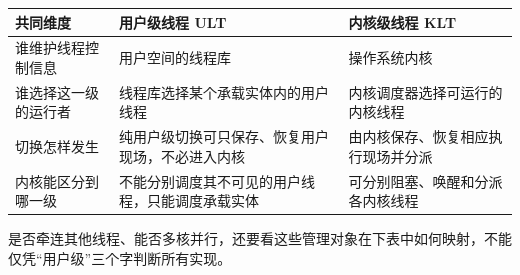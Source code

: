 \begin{wideblock}

\par\medskip\noindent\begin{minipage}{\linewidth}\fontsize{9.3}{12}\selectfont\begin{tabularx}{\linewidth}{@{}YYY@{}}
\toprule\noalign{}
\begin{minipage}[b]{\linewidth}\raggedright
共同维度
\end{minipage} & \begin{minipage}[b]{\linewidth}\raggedright
用户级线程 ULT
\end{minipage} & \begin{minipage}[b]{\linewidth}\raggedright
内核级线程 KLT
\end{minipage} \\
\midrule\noalign{}


谁维护线程控制信息 & 用户空间的线程库 & 操作系统内核 \\
谁选择这一级的运行者 & 线程库选择某个承载实体内的用户线程 & 内核调度器选择可运行的内核线程 \\
切换怎样发生 & 纯用户级切换可只保存、恢复用户现场，不必进入内核 & 由内核保存、恢复相应执行现场并分派 \\
内核能区分到哪一级 & 不能分别调度其不可见的用户线程，只能调度承载实体 & 可分别阻塞、唤醒和分派各内核线程 \\
\bottomrule\end{tabularx}
\end{minipage}\par\medskip

\end{wideblock}

是否牵连其他线程、能否多核并行，还要看这些管理对象在下表中如何映射，不能仅凭``用户级''三个字判断所有实现。

